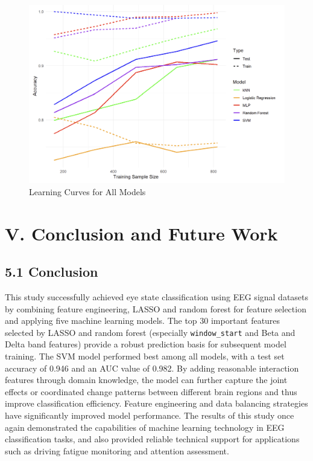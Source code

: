 \documentclass[
  doc]{apa6}
\begin{document}
\begin{figure}[H]

{\centering \includegraphics[width=0.85\linewidth]{figure/7} 

}

\caption{Learning Curves for All Models}\label{fig:unnamed-chunk-9}
\end{figure}

\section{V. Conclusion and Future Work}\label{v.-conclusion-and-future-work}

\subsection{5.1 Conclusion}\label{conclusion}

This study successfully achieved eye state classification using EEG signal datasets by combining feature engineering, LASSO and random forest for feature selection and applying five machine learning models. The top 30 important features selected by LASSO and random forest (especially \texttt{window\_start} and Beta and Delta band features) provide a robust prediction basis for subsequent model training. The SVM model performed best among all models, with a test set accuracy of 0.946 and an AUC value of 0.982. By adding reasonable interaction features through domain knowledge, the model can further capture the joint effects or coordinated change patterns between different brain regions and thus improve classification efficiency. Feature engineering and data balancing strategies have significantly improved model performance. The results of this study once again demonstrated the capabilities of machine learning technology in EEG classification tasks, and also provided reliable technical support for applications such as driving fatigue monitoring and attention assessment.
\end{document}
